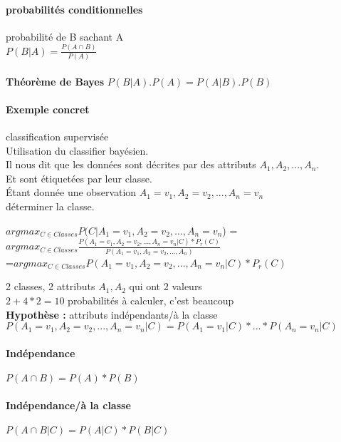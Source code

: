 \documentclass{article}
\begin{document}
\paragraph{probabilités conditionnelles}
probabilité de B sachant A \\ 
$P(B|A) = \frac{P(A \cap B)}{P(A)}$\\
\\
\textbf{Théorème de Bayes} $P(B|A).P(A) = P(A|B).P(B)$
\paragraph{Exemple concret} classification supervisée\\
Utilisation du classifier bayésien.\\
Il nous dit que les données sont décrites par des attributs $A_1,A_2,...,A_n$.\\Et sont étiquetées par leur classe.\\
Étant donnée une observation $A_1=v_1, A_2=v_2,...,A_n=v_n$\\
déterminer la classe.
\\
\begin{center}
$argmax_{C \in Classes} P(C|A_1=v_1, A_2=v_2,...,A_n=v_n$) =\\
$ argmax_{C \in Classes} \frac{P(A_1=v_1, A_2=v_2,...,A_n=v_n|C)*P_{r}(C)}{P(A_1=v_1, A_2=v_2,...,A_n)}$\\
=$ argmax_{C \in Classes} P(A_1=v_1, A_2=v_2,...,A_n=v_n|C)*P_{r}(C)$\\
\end{center} 
2 classes, 2 attributs $A_1,A_2$ qui ont 2 valeurs\\ 
$2+ 4*2 = 10$ probabilités à calculer, c'est beaucoup\\
\textbf{Hypothèse : }attributs indépendants/à la classe\\
$P(A_1=v_1, A_2=v_2,...,A_n=v_n|C)=P(A_1=v_1|C)*...*P(A_n=v_n|C)$
\paragraph{Indépendance} $P(A \cap B) = P(A)*P(B)$
\paragraph{Indépendance/à la classe} $P(A \cap B | C) = P(A|C) * P(B|C)$
\end{document}
